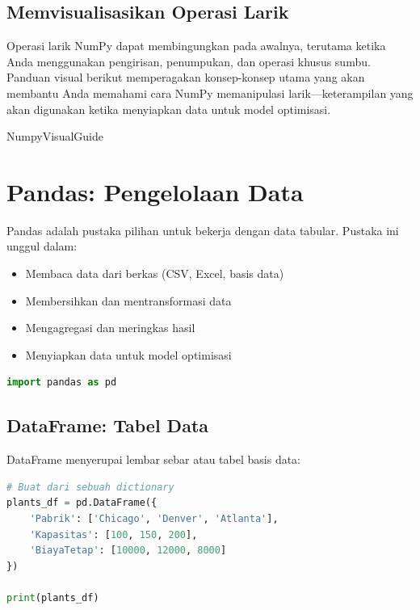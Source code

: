 \subsection{Memvisualisasikan Operasi Larik}

Operasi larik NumPy dapat membingungkan pada awalnya, terutama ketika Anda menggunakan pengirisan, penumpukan, dan operasi khusus sumbu. Panduan visual berikut memperagakan konsep-konsep utama yang akan membantu Anda memahami cara NumPy memanipulasi larik---keterampilan yang akan digunakan ketika menyiapkan data untuk model optimisasi.

{NumpyVisualGuide}

\section{Pandas: Pengelolaan Data}

Pandas adalah pustaka pilihan untuk bekerja dengan data tabular. Pustaka ini unggul dalam:
\begin{itemize}
\item Membaca data dari berkas (CSV, Excel, basis data)
\item Membersihkan dan mentransformasi data
\item Mengagregasi dan meringkas hasil
\item Menyiapkan data untuk model optimisasi
\end{itemize}

\begin{lstlisting}[language=Python]
import pandas as pd
\end{lstlisting}

\subsection{DataFrame: Tabel Data}

DataFrame menyerupai lembar sebar atau tabel basis data:

\begin{lstlisting}[language=Python]
# Buat dari sebuah dictionary
plants_df = pd.DataFrame({
    'Pabrik': ['Chicago', 'Denver', 'Atlanta'],
    'Kapasitas': [100, 150, 200],
    'BiayaTetap': [10000, 12000, 8000]
})

print(plants_df)
\end{lstlisting}

